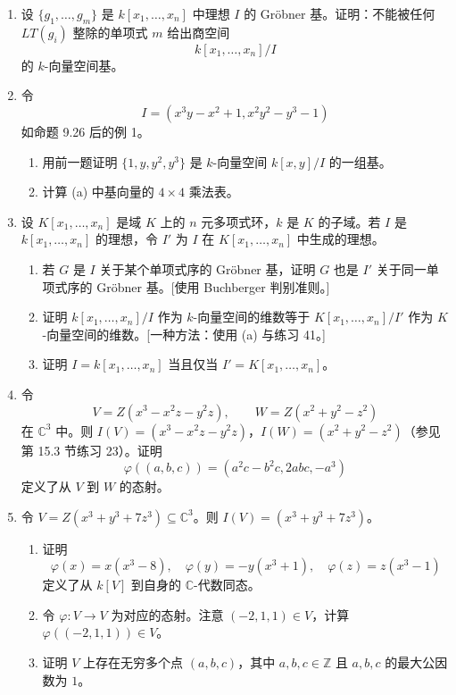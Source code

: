\begin{enumerate}[label=\arabic*.]
	\item 设 $\{g_1,
	\ldots,g_m\}$ 是 $k[x_1,
	\ldots,x_n]$ 中理想 $I$ 的 Gröbner 基。证明：不能被任何 $LT(g_i)$ 整除的单项式 $m$ 给出商空间
	\[
	k[x_1,
	\ldots,x_n]/I
	\]
	的 $k$-向量空间基。
	
	\item 令
	\[
	I=(x^3y-x^2+1,
	x^2y^2-y^3-1)
	\]
	如命题 9.26 后的例 1。
	\begin{enumerate}[label=(\alph*)]
		\item 用前一题证明 $\{1,y,y^2,y^3\}$ 是 $k$-向量空间 $k[x,y]/I$ 的一组基。
		\item 计算 (a) 中基向量的 $4\times4$ 乘法表。
	\end{enumerate}
	
	\item 设 $K[x_1,
	\ldots,x_n]$ 是域 $K$ 上的 $n$ 元多项式环，$k$ 是 $K$ 的子域。若 $I$ 是 $k[x_1,
	\ldots,x_n]$ 的理想，令 $I'$ 为 $I$ 在 $K[x_1,
	\ldots,x_n]$ 中生成的理想。
	\begin{enumerate}[label=(\alph*)]
		\item 若 $G$ 是 $I$ 关于某个单项式序的 Gröbner 基，证明 $G$ 也是 $I'$ 关于同一单项式序的 Gröbner 基。[使用 Buchberger 判别准则。]
		\item 证明 $k[x_1,
		\ldots,x_n]/I$ 作为 $k$-向量空间的维数等于 $K[x_1,
		\ldots,x_n]/I'$ 作为 $K$-向量空间的维数。[一种方法：使用 (a) 与练习 41。]
		\item 证明 $I=k[x_1,
		\ldots,x_n]$ 当且仅当 $I'=K[x_1,
		\ldots,x_n]$。
	\end{enumerate}
	
	\item 令
	\[
	V=Z(x^3-x^2z-y^2z),\qquad W=Z(x^2+y^2-z^2)
	\]
	在 $\mathbb C^3$ 中。则 $I(V)=(x^3-x^2z-y^2z)$，$I(W)=(x^2+y^2-z^2)$（参见第 15.3 节练习 23）。证明
	\[
	\varphi((a,b,c))=(a^2c-b^2c,
	2abc,
	-a^3)
	\]
	定义了从 $V$ 到 $W$ 的态射。
	
	\item 令 $V=Z(x^3+y^3+7z^3)\subseteq\mathbb C^3$。则 $I(V)=(x^3+y^3+7z^3)$。
	\begin{enumerate}[label=(\alph*)]
		\item 证明
		\[
		\varphi(x)=x(x^3-8),
		\quad
		\varphi(y)=-y(x^3+1),
		\quad
		\varphi(z)=z(x^3-1)
		\]
		定义了从 $k[V]$ 到自身的 $\mathbb C$-代数同态。
		\item 令 $\varphi:V\to V$ 为对应的态射。注意 $(-2,1,1)\in V$，计算 $\varphi((-2,1,1))\in V$。
		\item 证明 $V$ 上存在无穷多个点 $(a,b,c)$，其中 $a,b,c\in\mathbb Z$ 且 $a,b,c$ 的最大公因数为 $1$。
	\end{enumerate}
	

\end{enumerate}

